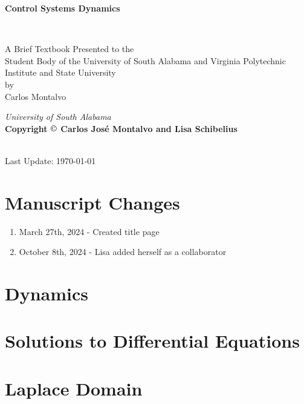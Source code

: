 \documentclass{article}
\begin{document}
\begin{center}
\begin{LARGE}{\bf Control Systems Dynamics}\end{LARGE}\\
\large
\vspace{22 mm}
\begin{singlespace}
   A Brief Textbook Presented to the \\ 
   Student Body of the University of South Alabama and Virginia Polytechnic Institute and State University \\
\vspace{22 mm}
   by\\
\vspace{22 mm}
  Carlos Montalvo \\
\vspace{22 mm}
\end{singlespace}
{\itshape University of South Alabama}\\
{\bf Copyright $\copyright$ Carlos Jos\'{e} Montalvo and Lisa Schibelius}

\\ Last Update: \today
\end{center}

\newpage

\section*{Manuscript Changes}

\begin{enumerate}[itemsep=-5pt]
\item March 27th, 2024 - Created title page
\item October 8th, 2024 - Lisa added herself as a collaborator
\end{enumerate}

\newpage

\section{Dynamics}

\section{Solutions to Differential Equations}

\section{Laplace Domain}
\end{document}

